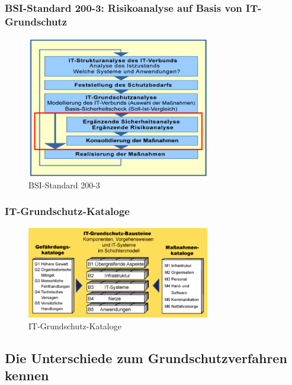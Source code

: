 \documentclass[10pt,a4paper]{article}
\begin{document}
\subsubsection*{BSI-Standard 200-3: Risikoanalyse auf Basis von IT-Grundschutz}
\begin{figure}[H]
    \begin{center}
    \includegraphics[width=8cm]{images/BSI200-3.png}
    \caption{BSI-Standard 200-3}
    \label{BSI-Standard 200-3}
    \end{center}
\end{figure}

\subsubsection*{IT-Grundschutz-Kataloge}
\begin{figure}[H]
    \begin{center}
    \includegraphics[width=8cm]{images/IT-Grundschutz-Kataloge.png}
    \caption{IT-Grundschutz-Kataloge}
    \label{IT-Grundschutz-Kataloge}
    \end{center}
\end{figure}


\subsection*{Die Unterschiede zum Grundschutzverfahren kennen}
\end{document}
